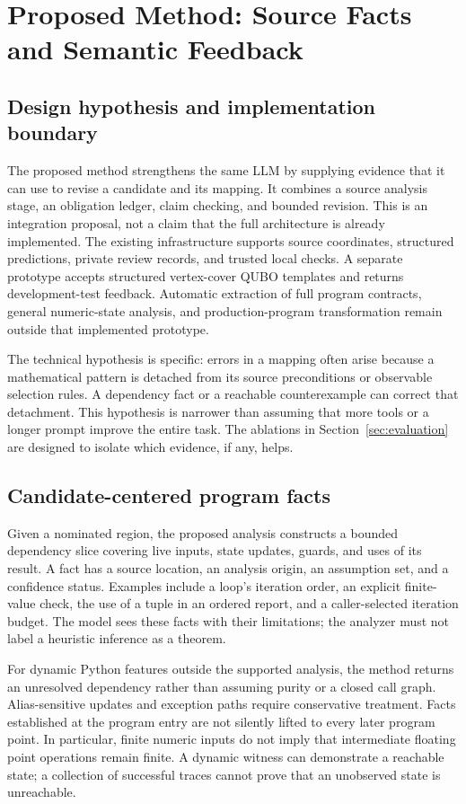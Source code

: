 \section{Proposed Method: Source Facts and Semantic Feedback}
\label{sec:method}
\subsection{Design hypothesis and implementation boundary}
The proposed method strengthens the same LLM by supplying evidence that it can
use to revise a candidate and its mapping. It combines a source analysis stage,
an obligation ledger, claim checking, and bounded revision. This is an integration
proposal, not a claim that the full architecture is already implemented. The
existing infrastructure supports source coordinates, structured predictions,
private review records, and trusted local checks. A separate prototype accepts
structured vertex-cover QUBO templates and returns development-test feedback.
Automatic extraction of full program contracts, general numeric-state analysis,
and production-program transformation remain outside that implemented prototype.

The technical hypothesis is specific: errors in a mapping often arise because
a mathematical pattern is detached from its source preconditions or observable
selection rules. A dependency fact or a reachable counterexample can correct that
detachment. This hypothesis is narrower than assuming that more tools or a longer
prompt improve the entire task. The ablations in Section~\ref{sec:evaluation}
are designed to isolate which evidence, if any, helps.

\subsection{Candidate-centered program facts}
Given a nominated region, the proposed analysis constructs a bounded dependency
slice covering live inputs, state updates, guards, and uses of its result. A fact
has a source location, an analysis origin, an assumption set, and a confidence
status. Examples include a loop's iteration order, an explicit finite-value check,
the use of a tuple in an ordered report, and a caller-selected iteration budget.
The model sees these facts with their limitations; the analyzer must not label a
heuristic inference as a theorem.

For dynamic Python features outside the supported analysis, the method returns
an unresolved dependency rather than assuming purity or a closed call graph.
Alias-sensitive updates and exception paths require conservative treatment.
Facts established at the program entry are not silently lifted to every later
program point. In particular, finite numeric inputs do not imply that intermediate
floating point operations remain finite. A dynamic witness can demonstrate a
reachable state; a collection of successful traces cannot prove that an unobserved
state is unreachable.

